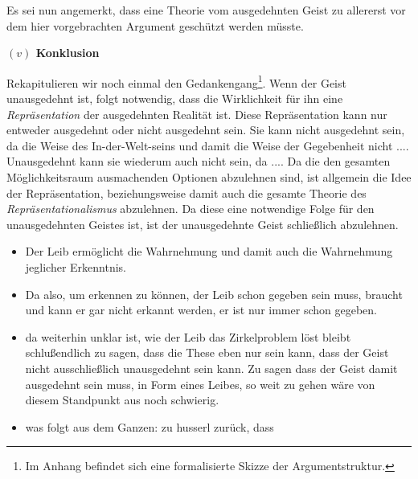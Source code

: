 \documentclass[a4paper, 12pt]{article}
\begin{document}
\begin{onehalfspace}
Es sei nun angemerkt, dass eine Theorie vom ausgedehnten Geist zu allererst vor dem hier vorgebrachten Argument geschützt werden müsste. 





\vspace{5mm}
\noindent\textbf{$(v)$ Konklusion}

\noindent Rekapitulieren wir noch einmal den Gedankengang\footnote{Im Anhang befindet sich eine formalisierte Skizze der Argumentstruktur.}. Wenn der Geist unausgedehnt ist, folgt notwendig, dass die Wirklichkeit für ihn eine \emph{Repräsentation} der ausgedehnten Realität ist. Diese Repräsentation kann nur entweder ausgedehnt oder nicht ausgedehnt sein. Sie kann nicht ausgedehnt sein, da die Weise des In-der-Welt-seins und damit die Weise der Gegebenheit nicht .... Unausgedehnt kann sie wiederum auch nicht sein, da .... Da die den gesamten Möglichkeitsraum ausmachenden Optionen abzulehnen sind, ist allgemein die Idee der Repräsentation, beziehungsweise damit auch die gesamte Theorie des \emph{Repräsentationalismus} abzulehnen. Da diese eine notwendige Folge für den unausgedehnten Geistes ist, ist der unausgedehnte Geist schließlich abzulehnen.



\begin{itemize}
  \item Der Leib ermöglicht die Wahrnehmung und damit auch die Wahrnehmung jeglicher Erkenntnis.
  \item Da also, um erkennen zu können, der Leib schon gegeben sein muss, braucht und kann er gar nicht erkannt werden, er ist nur immer schon gegeben.
  \item da weiterhin unklar ist, wie der Leib das Zirkelproblem löst bleibt schlußendlich zu sagen, dass die These eben nur sein kann, dass der Geist nicht ausschließlich unausgedehnt sein kann. Zu sagen dass der Geist damit ausgedehnt sein muss, in Form eines Leibes, so weit zu gehen wäre von diesem Standpunkt aus noch schwierig.
  \item was folgt aus dem Ganzen: zu husserl zurück, dass 
\end{itemize}





\end{onehalfspace}
\end{document}

